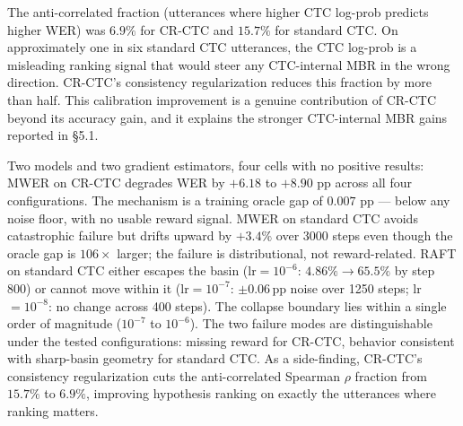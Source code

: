 The anti-correlated fraction (utterances where higher CTC log-prob predicts higher WER) was $6.9\%$ for CR-CTC and $15.7\%$ for standard CTC. On approximately one in six standard CTC utterances, the CTC log-prob is a misleading ranking signal that would steer any CTC-internal MBR in the wrong direction. CR-CTC's consistency regularization reduces this fraction by more than half. This calibration improvement is a genuine contribution of CR-CTC beyond its accuracy gain, and it explains the stronger CTC-internal MBR gains reported in §5.1.



Two models and two gradient estimators, four cells with no positive results: MWER on CR-CTC degrades WER by $+6.18$ to $+8.90$ pp across all four configurations. The mechanism is a training oracle gap of $0.007$ pp — below any noise floor, with no usable reward signal. MWER on standard CTC avoids catastrophic failure but drifts upward by $+3.4\%$ over 3000 steps even though the oracle gap is $106\times$ larger; the failure is distributional, not reward-related. RAFT on standard CTC either escapes the basin (lr$=10^{-6}$: $4.86\% \to 65.5\%$ by step 800) or cannot move within it (lr$=10^{-7}$: $\pm 0.06$\,pp noise over 1250 steps; lr$=10^{-8}$: no change across 400 steps). The collapse boundary lies within a single order of magnitude ($10^{-7}$ to $10^{-6}$). The two failure modes are distinguishable under the tested configurations: missing reward for CR-CTC, behavior consistent with sharp-basin geometry for standard CTC. As a side-finding, CR-CTC's consistency regularization cuts the anti-correlated Spearman $\rho$ fraction from $15.7\%$ to $6.9\%$, improving hypothesis ranking on exactly the utterances where ranking matters.




